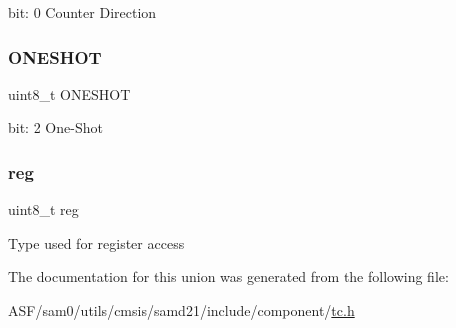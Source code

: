 bit\+: 0 Counter Direction \mbox{\label{union_t_c___c_t_r_l_b_s_e_t___type_a7b9c94dc8f69244e81941bd1c96ca561}} 
\subsubsection{\texorpdfstring{ONESHOT}{ONESHOT}}
{\footnotesize\ttfamily uint8\+\_\+t O\+N\+E\+S\+H\+OT}

bit\+: 2 One-\/\+Shot \mbox{\label{union_t_c___c_t_r_l_b_s_e_t___type_a9428adc9af4653a2050e2536b55dec8d}} 
\subsubsection{\texorpdfstring{reg}{reg}}
{\footnotesize\ttfamily uint8\+\_\+t reg}

Type used for register access 

The documentation for this union was generated from the following file\+:\begin{DoxyCompactItemize}
\item 
A\+S\+F/sam0/utils/cmsis/samd21/include/component/\mbox{\hyperlink{utils_2cmsis_2samd21_2include_2component_2tc_8h}{tc.\+h}}\end{DoxyCompactItemize}
